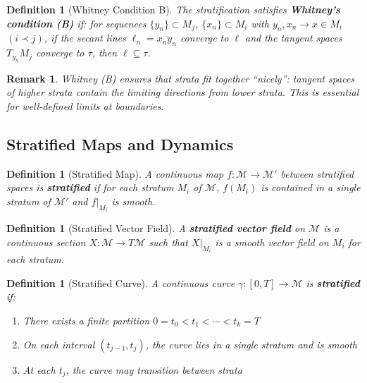 \documentclass[11pt,a4paper]{article}
\newtheorem{definition}[theorem]{Definition}
\newtheorem{remark}[theorem]{Remark}
\begin{document}
\begin{definition}[Whitney Condition B]
The stratification satisfies \textbf{Whitney's condition (B)} if: for sequences $\{y_n\} \subset M_j$, $\{x_n\} \subset M_i$ with $y_n, x_n \to x \in M_i$ $(i \prec j)$, if the secant lines $\ell_n = \overline{x_n y_n}$ converge to $\ell$ and the tangent spaces $T_{y_n} M_j$ converge to $\tau$, then $\ell \subseteq \tau$.
\end{definition}

\begin{remark}
Whitney (B) ensures that strata fit together ``nicely'': tangent spaces of higher strata contain the limiting directions from lower strata. This is essential for well-defined limits at boundaries.
\end{remark}

\subsection{Stratified Maps and Dynamics}

\begin{definition}[Stratified Map]
A continuous map $f : \mathcal{M} \to \mathcal{M}'$ between stratified spaces is \textbf{stratified} if for each stratum $M_i$ of $\mathcal{M}$, $f(M_i)$ is contained in a single stratum of $\mathcal{M}'$ and $f|_{M_i}$ is smooth.
\end{definition}

\begin{definition}[Stratified Vector Field]
A \textbf{stratified vector field} on $\mathcal{M}$ is a continuous section $X : \mathcal{M} \to T\mathcal{M}$ such that $X|_{M_i}$ is a smooth vector field on $M_i$ for each stratum.
\end{definition}

\begin{definition}[Stratified Curve]
A continuous curve $\gamma : [0, T] \to \mathcal{M}$ is \textbf{stratified} if:
\begin{enumerate}
    \item[(i)] There exists a finite partition $0 = t_0 < t_1 < \cdots < t_k = T$
    \item[(ii)] On each interval $(t_{j-1}, t_j)$, the curve lies in a single stratum and is smooth
    \item[(iii)] At each $t_j$, the curve may transition between strata
\end{enumerate}
\end{definition}
\end{document}
